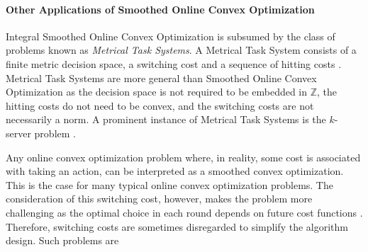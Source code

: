 \paragraph{Other Applications of Smoothed Online Convex Optimization} Integral Smoothed Online Convex Optimization is subsumed by the class of problems known as \textit{Metrical Task Systems}. A Metrical Task System consists of a finite metric decision space, a switching cost and a sequence of hitting costs \cite{Bubeck2018_3}. Metrical Task Systems are more general than Smoothed Online Convex Optimization as the decision space is not required to be embedded in $\mathbb{Z}$, the hitting costs do not need to be convex, and the switching costs are not necessarily a norm. A prominent instance of Metrical Task Systems is the $k$-server problem \cite{Bubeck2017}.

Any online convex optimization problem where, in reality, some cost is associated with taking an action, can be interpreted as a smoothed convex optimization. This is the case for many typical online convex optimization problems. The consideration of this switching cost, however, makes the problem more challenging as the optimal choice in each round depends on future cost functions \cite{Chen2015}. Therefore, switching costs are sometimes disregarded to simplify the algorithm design. Such problems are

